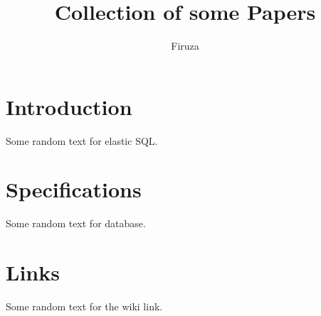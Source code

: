 \documentclass[conference]{IEEEtran}
\title{Collection of some Papers}
\author{Firuza}
\date{}
\begin{document}
    \maketitle
    \section{Introduction}
    Some random text for elastic SQL. \cite{Tatemura} \lipsum[1-2]

    \section{Specifications}
    Some random text for database. \cite{ullman} \lipsum[1-2]

    \section{Links}
    Some random text for the wiki link. \cite{wiki} \lipsum[1-2]

	
	
\end{document}
